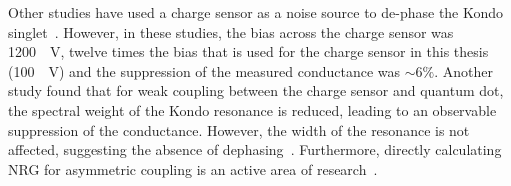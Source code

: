 Other studies have used a charge sensor as a noise source to de-phase the Kondo singlet~\cite{kondo_controlled_dephasing}. However, in these studies, the bias across the charge sensor was \qty{1200}{\mu V}, twelve times the bias that is used for the charge sensor in this thesis (\qty{100}{\mu V}) and the suppression of the measured conductance was $\sim6\%$. 
Another study found that for weak coupling between the charge sensor and quantum dot, the spectral weight of the Kondo resonance is reduced, leading to an observable suppression of the conductance. However, the width of the resonance is not affected, suggesting the absence of dephasing~\cite{peculiar_dephasing_of_kondo}. Furthermore, directly calculating NRG for asymmetric coupling is an active area of research~\cite{kondo_nrg_asymmetric}.







